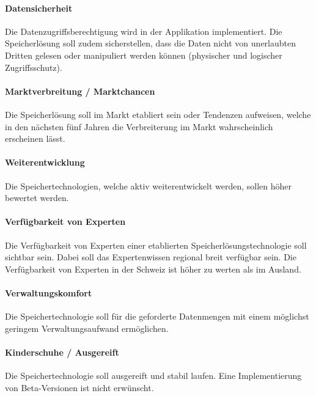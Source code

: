\paragraph{Datensicherheit}\label{Soll-5-4}
Die Datenzugriffsberechtigung wird in der Applikation implementiert. Die Speicherlösung soll zudem sicherstellen, dass die Daten nicht von unerlaubten Dritten gelesen oder manipuliert werden können (physischer und logischer Zugriffsschutz).

\setcounter{paragraph}{0}
\renewcommand\theparagraph{Soll-6-\arabic{paragraph}}

\paragraph{Marktverbreitung / Marktchancen}\label{Soll-6-1}
Die Speicherlösung soll im Markt etabliert sein oder Tendenzen aufweisen, welche in den nächsten fünf Jahren die Verbreiterung im Markt wahrscheinlich erscheinen lässt.

\paragraph{Weiterentwicklung}\label{Soll-6-2}
Die Speichertechnologien, welche aktiv weiterentwickelt werden, sollen höher bewertet werden.

\paragraph{Verfügbarkeit von Experten}\label{Soll-6-3}
Die Verfügbarkeit von Experten einer etablierten Speicherlösungstechnologie soll sichtbar sein. Dabei soll das Expertenwissen regional breit verfügbar sein. Die Verfügbarkeit von Experten in der Schweiz ist höher zu werten als im Ausland.

\paragraph{Verwaltungskomfort}\label{Soll-6-4}
Die Speichertechnologie soll für die geforderte Datenmengen mit einem möglichst geringem Verwaltungsaufwand ermöglichen.

\paragraph{Kinderschuhe / Ausgereift}\label{Soll-6-5}
Die Speichertechnologie soll ausgereift und stabil laufen. Eine Implementierung von Beta-Versionen ist nicht erwünscht.

